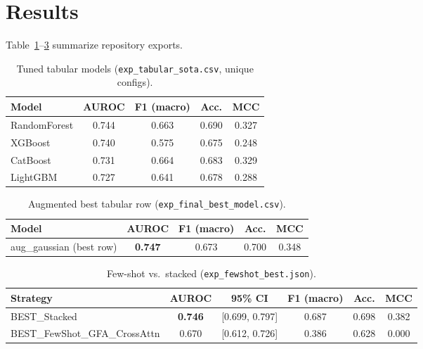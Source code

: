 \section{Results}
\label{sec:res}

Table~\ref{tab:tabular_c}--\ref{tab:stackc} summarize repository exports.

\begin{table}[htbp]
  \centering
  \caption{Tuned tabular models (\texttt{exp\_tabular\_sota.csv}, unique configs).}
  \label{tab:tabular_c}
  \begin{tabular}{lcccc}
    \toprule
    Model & AUROC & F1 (macro) & Acc. & MCC \\
    \midrule
    RandomForest & 0.744 & 0.663 & 0.690 & 0.327 \\
    XGBoost & 0.740 & 0.575 & 0.675 & 0.248 \\
    CatBoost & 0.731 & 0.664 & 0.683 & 0.329 \\
    LightGBM & 0.727 & 0.641 & 0.678 & 0.288 \\
    \bottomrule
  \end{tabular}
\end{table}

\begin{table}[htbp]
  \centering
  \caption{Augmented best tabular row (\texttt{exp\_final\_best\_model.csv}).}
  \label{tab:aug}
  \begin{tabular}{lcccc}
    \toprule
    Model & AUROC & F1 (macro) & Acc. & MCC \\
    \midrule
    aug\_gaussian (best row) & \textbf{0.747} & 0.673 & 0.700 & 0.348 \\
    \bottomrule
  \end{tabular}
\end{table}

\begin{table}[htbp]
  \centering
  \caption{Few-shot vs.\ stacked (\texttt{exp\_fewshot\_best.json}).}
  \label{tab:stackc}
  \begin{tabular}{lccccc}
    \toprule
    Strategy & AUROC & 95\% CI & F1 (macro) & Acc. & MCC \\
    \midrule
    BEST\_Stacked & \textbf{0.746} & [0.699, 0.797] & 0.687 & 0.698 & 0.382 \\
    BEST\_FewShot\_GFA\_CrossAttn & 0.670 & [0.612, 0.726] & 0.386 & 0.628 & 0.000 \\
    \bottomrule
  \end{tabular}
\end{table}

